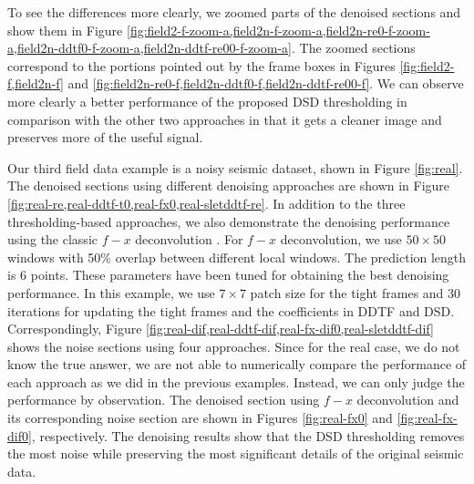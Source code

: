 To see the differences more clearly, we zoomed parts of the denoised sections and show them in Figure \ref{fig:field2-f-zoom-a,field2n-f-zoom-a,field2n-re0-f-zoom-a,field2n-ddtf0-f-zoom-a,field2n-ddtf-re00-f-zoom-a}. The zoomed sections correspond to the portions pointed out by the frame boxes in Figures \ref{fig:field2-f,field2n-f} and \ref{fig:field2n-re0-f,field2n-ddtf0-f,field2n-ddtf-re00-f}. We can observe more clearly a better performance of the proposed DSD thresholding in comparison with the other two approaches in that it gets a cleaner image and preserves more of the useful signal. %

Our third field data example is a noisy seismic dataset, shown in Figure \ref{fig:real}. The denoised sections using different denoising approaches are shown in Figure \ref{fig:real-re,real-ddtf-t0,real-fx0,real-sletddtf-re}. In addition to the three thresholding-based approaches, we also demonstrate the denoising performance using the classic $f-x$ deconvolution \cite[]{gulunay1986,galbraith1991,yangkang20141}. 
For $f-x$ deconvolution, we use $50\times50$ windows with 50\% overlap between different local windows. The prediction length is 6 points. These parameters have been tuned for obtaining the best denoising performance. %
In this example, we use $7\times7$ patch size for the tight frames and 30 iterations for updating the tight frames and the coefficients in DDTF and DSD.
Correspondingly, Figure \ref{fig:real-dif,real-ddtf-dif,real-fx-dif0,real-sletddtf-dif} shows the noise sections using four approaches. Since for the real case, we do not know the true answer, we are not able to numerically compare the performance of each approach as we did in the previous examples. Instead, we can only judge the performance by observation. The denoised section using $f-x$ deconvolution and its corresponding noise section are shown in Figures \ref{fig:real-fx0} and \ref{fig:real-fx-dif0}, respectively. The denoising results show that the DSD thresholding removes the most noise while preserving the most significant details of the original seismic data. 



